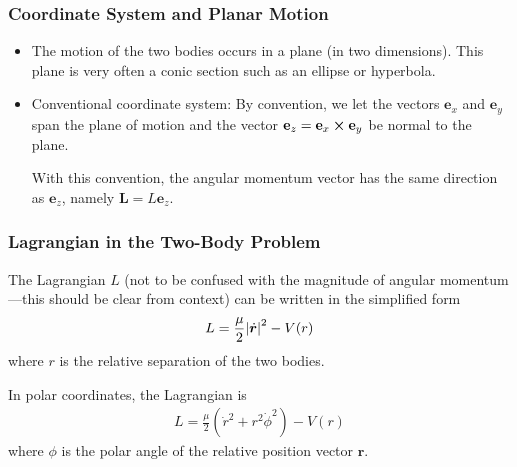 \documentclass[11pt, a4paper]{article}
\newcommand{\e}{\mathbf{e}} %
\begin{document}
\subsubsection{Coordinate System and Planar Motion}

\begin{itemize}
	
	\item The motion of the two bodies occurs in a plane (in two dimensions). This plane is very often a conic section such as an ellipse or hyperbola.
	
	\item Conventional coordinate system: By convention, we let the vectors $ \e_x $ and $ \e_y $ span the plane of motion and the vector $ \e_z = \e_x \cross \e_y $ be normal to the plane.
	
	With this convention, the angular momentum vector has the same direction as $ \e_z $, namely $ \bm{L} = L \e_z $.
	
\end{itemize}

\subsubsection{Lagrangian in the Two-Body Problem}

The Lagrangian $ L $ (not to be confused with the magnitude of angular momentum---this should be clear from context) can be written in the simplified form
\begin{align*}
	L = \frac{\mu}{2} \abs{\dot{\bm{r}}}^2 - V(r)
\end{align*}
where $ r $ is the relative separation of the two bodies.

In polar coordinates, the Lagrangian is
\begin{align*}
	L = \frac{\mu}{2} \left( \dot{r}^2 + r^2 \dot{\phi}^2 \right) - V(r)
\end{align*}
where $ \phi $ is the polar angle of the relative position vector $ \bm{r} $.
\end{document}
